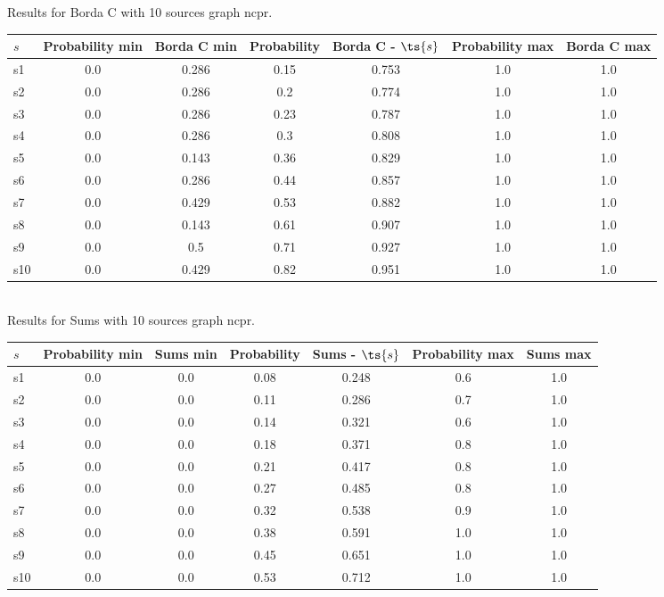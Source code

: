 \documentclass{article}
\begin{document}
\noindent Results for Borda C with 10 sources graph ncpr.

\noindent\begin{tabular}{|l|c|c|c|c|c|c|}
\hline
$s$& Probability min & Borda C min & Probability & Borda C - $\ts{s}$ & Probability max & Borda C max\\
\hline
s1 &0.0 & 0.286 & 0.15 & 0.753 & 1.0 & 1.0\\
\hline
s2 &0.0 & 0.286 & 0.2 & 0.774 & 1.0 & 1.0\\
\hline
s3 &0.0 & 0.286 & 0.23 & 0.787 & 1.0 & 1.0\\
\hline
s4 &0.0 & 0.286 & 0.3 & 0.808 & 1.0 & 1.0\\
\hline
s5 &0.0 & 0.143 & 0.36 & 0.829 & 1.0 & 1.0\\
\hline
s6 &0.0 & 0.286 & 0.44 & 0.857 & 1.0 & 1.0\\
\hline
s7 &0.0 & 0.429 & 0.53 & 0.882 & 1.0 & 1.0\\
\hline
s8 &0.0 & 0.143 & 0.61 & 0.907 & 1.0 & 1.0\\
\hline
s9 &0.0 & 0.5 & 0.71 & 0.927 & 1.0 & 1.0\\
\hline
s10 &0.0 & 0.429 & 0.82 & 0.951 & 1.0 & 1.0\\
\hline
\end{tabular}\\

\noindent Results for Sums with 10 sources graph ncpr.

\noindent\begin{tabular}{|l|c|c|c|c|c|c|}
\hline
$s$& Probability min & Sums min & Probability & Sums - $\ts{s}$ & Probability max & Sums max\\
\hline
s1 &0.0 & 0.0 & 0.08 & 0.248 & 0.6 & 1.0\\
\hline
s2 &0.0 & 0.0 & 0.11 & 0.286 & 0.7 & 1.0\\
\hline
s3 &0.0 & 0.0 & 0.14 & 0.321 & 0.6 & 1.0\\
\hline
s4 &0.0 & 0.0 & 0.18 & 0.371 & 0.8 & 1.0\\
\hline
s5 &0.0 & 0.0 & 0.21 & 0.417 & 0.8 & 1.0\\
\hline
s6 &0.0 & 0.0 & 0.27 & 0.485 & 0.8 & 1.0\\
\hline
s7 &0.0 & 0.0 & 0.32 & 0.538 & 0.9 & 1.0\\
\hline
s8 &0.0 & 0.0 & 0.38 & 0.591 & 1.0 & 1.0\\
\hline
s9 &0.0 & 0.0 & 0.45 & 0.651 & 1.0 & 1.0\\
\hline
s10 &0.0 & 0.0 & 0.53 & 0.712 & 1.0 & 1.0\\
\hline
\end{tabular}\\
\end{document}

